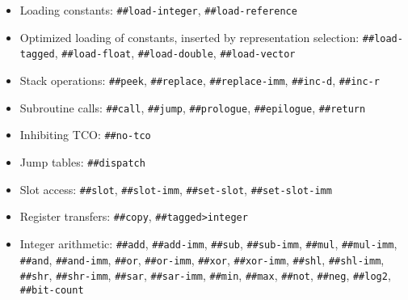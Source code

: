 
\begin{itemize}
\item
\begin{flushleft}
Loading constants:
\Verb|##load-integer|,
\Verb|##load-reference|
\end{flushleft}

\item
\begin{flushleft}
Optimized loading of constants, inserted by representation selection:
\Verb|##load-tagged|,
\Verb|##load-float|,
\Verb|##load-double|,
\Verb|##load-vector|
\end{flushleft}

\item
\begin{flushleft}
Stack operations:
\Verb|##peek|,
\Verb|##replace|,
\Verb|##replace-imm|,
\Verb|##inc-d|,
\Verb|##inc-r|
\end{flushleft}

\item
\begin{flushleft}
Subroutine calls:
\Verb|##call|,
\Verb|##jump|,
\Verb|##prologue|,
\Verb|##epilogue|,
\Verb|##return|
\end{flushleft}

\item
\begin{flushleft}
Inhibiting \gls{TCO}:
\Verb|##no-tco|
\end{flushleft}

\item
\begin{flushleft}
Jump tables:
\Verb|##dispatch|
\end{flushleft}

\item
\begin{flushleft}
Slot access:
\Verb|##slot|,
\Verb|##slot-imm|,
\Verb|##set-slot|,
\Verb|##set-slot-imm|
\end{flushleft}

\item
\begin{flushleft}
Register transfers:
\Verb|##copy|,
\Verb|##tagged>integer|
\end{flushleft}

\item
\begin{flushleft}
Integer arithmetic:
\Verb|##add|,
\Verb|##add-imm|,
\Verb|##sub|,
\Verb|##sub-imm|,
\Verb|##mul|,
\Verb|##mul-imm|,
\Verb|##and|,
\Verb|##and-imm|,
\Verb|##or|,
\Verb|##or-imm|,
\Verb|##xor|,
\Verb|##xor-imm|,
\Verb|##shl|,
\Verb|##shl-imm|,
\Verb|##shr|,
\Verb|##shr-imm|,
\Verb|##sar|,
\Verb|##sar-imm|,
\Verb|##min|,
\Verb|##max|,
\Verb|##not|,
\Verb|##neg|,
\Verb|##log2|,
\Verb|##bit-count|
\end{flushleft}


\end{itemize}

